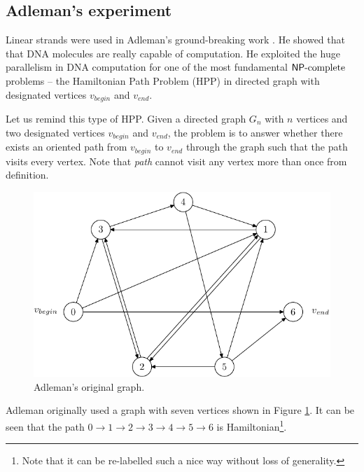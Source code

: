 	\subsection{Adleman's experiment}
	\label{sec:adleman}
		
		Linear strands were used in Adleman's ground-breaking work \cite{adleman94}. He showed that that DNA molecules are really capable of computation. He exploited the huge parallelism in DNA computation for one of the most fundamental $\mathsf{NP}\textnormal{-complete}$ problems -- the Hamiltonian Path Problem (HPP) in directed graph with designated vertices $v_{begin}$ and $v_{end}$.
		
		Let us remind this type of HPP. Given a directed graph $G_n$ with $n$ vertices and two designated vertices $v_{begin}$ and $v_{end}$, the problem is to answer whether there exists an oriented path from $v_{begin}$ to $v_{end}$ through the graph such that the path visits every vertex. Note that {\em path} cannot visit any vertex more than once from definition.
		
		\begin{figure}[H]
		\begin{center}
			\includegraphics{./figures/adleman_graph.pdf}
			\caption{Adleman's original graph.}
			\label{fig:adleman_graph}
		\end{center}
		\end{figure}
		
		Adleman originally used a graph with seven vertices shown in Figure \ref{fig:adleman_graph}. It can be seen that the path $0 \rightarrow 1 \rightarrow 2 \rightarrow 3 \rightarrow 4 \rightarrow 5 \rightarrow 6$ is Hamiltonian\footnote{Note that it can be re-labelled such a nice way without loss of generality.}.
		
